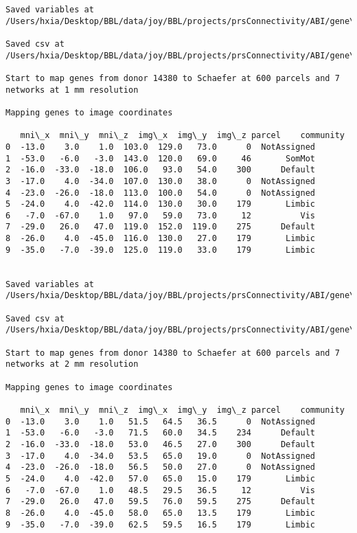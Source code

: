 \documentclass[11pt]{article}
\begin{document}
\begin{Verbatim}[commandchars=\\\{\}]
Saved variables at /Users/hxia/Desktop/BBL/data/joy/BBL/projects/prsConnectivity/ABI/gene\_mapping/14380donor\_400Parcels\_17Network\_2mm.pkl

Saved csv at /Users/hxia/Desktop/BBL/data/joy/BBL/projects/prsConnectivity/ABI/gene\_mapping/14380donor\_400Parcels\_17Network\_2mm.csv

Start to map genes from donor 14380 to Schaefer at 600 parcels and 7 networks at 1 mm resolution

Mapping genes to image coordinates

   mni\_x  mni\_y  mni\_z  img\_x  img\_y  img\_z parcel    community
0  -13.0    3.0    1.0  103.0  129.0   73.0      0  NotAssigned
1  -53.0   -6.0   -3.0  143.0  120.0   69.0     46       SomMot
2  -16.0  -33.0  -18.0  106.0   93.0   54.0    300      Default
3  -17.0    4.0  -34.0  107.0  130.0   38.0      0  NotAssigned
4  -23.0  -26.0  -18.0  113.0  100.0   54.0      0  NotAssigned
5  -24.0    4.0  -42.0  114.0  130.0   30.0    179       Limbic
6   -7.0  -67.0    1.0   97.0   59.0   73.0     12          Vis
7  -29.0   26.0   47.0  119.0  152.0  119.0    275      Default
8  -26.0    4.0  -45.0  116.0  130.0   27.0    179       Limbic
9  -35.0   -7.0  -39.0  125.0  119.0   33.0    179       Limbic


Saved variables at /Users/hxia/Desktop/BBL/data/joy/BBL/projects/prsConnectivity/ABI/gene\_mapping/14380donor\_600Parcels\_7Network\_1mm.pkl

Saved csv at /Users/hxia/Desktop/BBL/data/joy/BBL/projects/prsConnectivity/ABI/gene\_mapping/14380donor\_600Parcels\_7Network\_1mm.csv

Start to map genes from donor 14380 to Schaefer at 600 parcels and 7 networks at 2 mm resolution

Mapping genes to image coordinates

   mni\_x  mni\_y  mni\_z  img\_x  img\_y  img\_z parcel    community
0  -13.0    3.0    1.0   51.5   64.5   36.5      0  NotAssigned
1  -53.0   -6.0   -3.0   71.5   60.0   34.5    234      Default
2  -16.0  -33.0  -18.0   53.0   46.5   27.0    300      Default
3  -17.0    4.0  -34.0   53.5   65.0   19.0      0  NotAssigned
4  -23.0  -26.0  -18.0   56.5   50.0   27.0      0  NotAssigned
5  -24.0    4.0  -42.0   57.0   65.0   15.0    179       Limbic
6   -7.0  -67.0    1.0   48.5   29.5   36.5     12          Vis
7  -29.0   26.0   47.0   59.5   76.0   59.5    275      Default
8  -26.0    4.0  -45.0   58.0   65.0   13.5    179       Limbic
9  -35.0   -7.0  -39.0   62.5   59.5   16.5    179       Limbic



\end{Verbatim}
\end{document}
